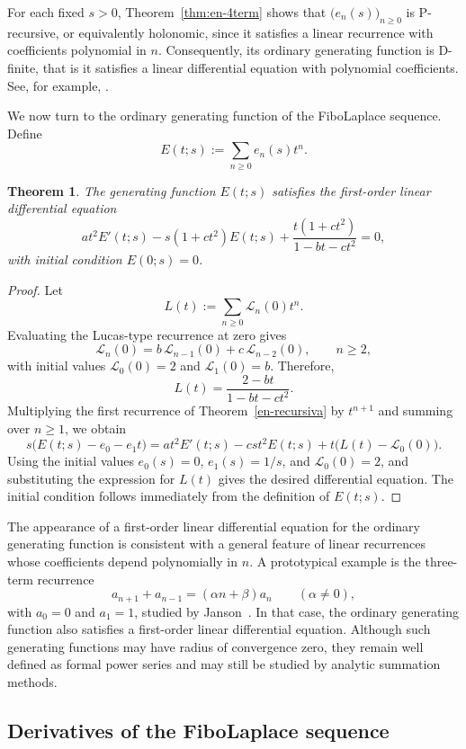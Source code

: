 \documentclass[11pt]{amsart}
\newcommand{\Lt}[1]{\mathscr{L}_{#1}}
\theoremstyle{plain}
\numberwithin{equation}{section}
\newtheorem{theorem}[thm]{Theorem}
\begin{document}
For each fixed $s>0$, Theorem~\ref{thm:en-4term} shows that
$\bigl(e_n(s)\bigr)_{n\geq 0}$ is P-recursive, or equivalently holonomic,
since it satisfies a linear recurrence with coefficients polynomial in
$n$. Consequently, its ordinary generating function is D-finite, that is  it
satisfies a linear differential equation with polynomial coefficients.
See, for example, \cite{Kauers}.

We now turn to the ordinary generating function of the FiboLaplace sequence. Define
\[
E(t;s):=\sum_{n\geq 0}e_n(s)t^n.
\]


\begin{theorem}\label{thm:ODE-E}
The generating function $E(t;s)$ satisfies the first-order linear differential equation
\[
a t^2 E'(t;s)-s(1+c t^2)E(t;s)
+\frac{t(1+c t^2)}{1-bt-ct^2}=0,
\]
with initial condition $E(0;s)=0$.
\end{theorem}
\begin{proof}
Let
\[
L(t):=\sum_{n\ge 0}\Lt{n}(0)t^n.
\] Evaluating the Lucas-type recurrence at zero gives
\[
\Lt{n}(0)=b\,\Lt{n-1}(0)+c\,\Lt{n-2}(0),
\qquad n\geq 2,
\]
with initial values $\Lt{0}(0)=2$ and $\Lt{1}(0)=b$. Therefore,
\[
L(t)=\frac{2-bt}{1-bt-ct^2}.
\]
Multiplying the first recurrence of Theorem~\ref{en-recursiva} by $t^{n+1}$
and summing over $n\geq 1$, we obtain
\[
s\bigl(E(t;s)-e_0-e_1t\bigr)=a t^2 E'(t;s)-c s t^2 E(t;s)+t\bigl(L(t)-\Lt{0}(0)\bigr).
\]
Using the initial values $e_0(s)=0$, $e_1(s)=1/s$, and $\Lt{0}(0)=2$, and substituting the expression for $L(t)$ gives the desired differential equation. The initial condition follows immediately from the definition of $E(t;s)$.
\end{proof}


The appearance of a first-order linear differential equation for the ordinary generating function is consistent
with a general feature of linear recurrences whose coefficients depend polynomially in $n$. A prototypical example is the three-term recurrence
\[
a_{n+1}+a_{n-1}=(\alpha n+\beta)a_n\qquad(\alpha\ne 0),
\]
with $a_0=0$ and $a_1=1$, studied by Janson~\cite{JansonDivergentGF}. In that case, the ordinary generating function also satisfies a first-order linear differential equation. Although such generating functions may have radius of convergence zero, they remain well defined as formal power series and may still be studied by analytic summation methods.

\subsection{Derivatives of the FiboLaplace sequence}
\end{document}

